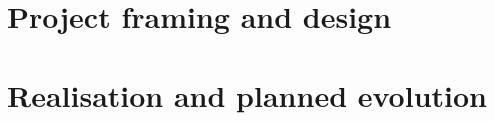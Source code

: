 \documentclass[oneside,12pt]{Classes/aesm_edspia}
\begin{document}


\mainmatter
\pagestyle{fancy}

\fancyhf{}
\fancyfoot[R]{\thepage}
\renewcommand{\headrulewidth}{0.5pt}
\renewcommand{\footrulewidth}{0pt}

\part{Project framing and design}

\part{Realisation and planned evolution}

\backmatter
\pagestyle{fancy}
\fancyhf{}
\renewcommand{\chaptermark}[1]{\markboth{Conclusion and Perspectives}{}}
\fancyfoot[R]{\thepage}
\renewcommand{\headrulewidth}{0.5pt}
\renewcommand{\footrulewidth}{0pt}



\singlespacing
\renewcommand{\bibname}{References}


\onehalfspacing
\appendix

\end{document}
